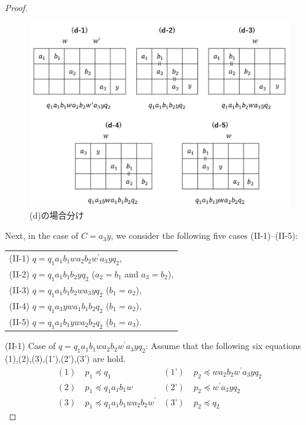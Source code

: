 \begin{proof}
\begin{figure}
  \centering
  \includegraphics[width=\linewidth]{figs/Cases-d.png}
  \vspace{-1cm}
  \caption{(d)の場合分け}
  \label{d組み合わせ}
\end{figure}
    
Next, in the case of $C=a_{3}y$, we consider the following five cases (II-1)--(II-5):

\begin{tabular}{l}
(II-1) $q=q_{1}a_{1}b_{1}wa_{2}b_{2}w^{\prime}a_{3}yq_{2}$,\\
(II-2) $q=q_{1}a_{1}b_{1}b_{2}yq_{2}$ ($a_{2}=b_{1}$ and $a_{3}=b_{2}$),\\
(II-3) $q=q_{1}a_{1}b_{1}b_{2}wa_{3}yq_{2}$ ($b_{1}=a_{2}$),\\
(II-4) $q=q_{1}a_{3}ywa_{1}b_{1}b_{2}q_{2}$ ($b_{1}=a_{2}$),\\
(II-5) $q=q_{1}a_{1}b_{1}ywa_{2}b_{2}q_{2}$ ($b_{1}=a_{3}$).
\end{tabular}

\noindent
(II-1) Case of $q=q_{1}a_{1}b_{1}wa_{2}b_{2}w^{\prime}a_{3}yq_{2}$:
Assume that the following six equations (1),(2),(3),(1'),(2'),(3') are hold.
\begin{align*}
(1)~& p_{1} \preceq q_{1} & (\text{1'})~& p_{2} \preceq wa_{2}b_{2}w^{\prime}a_{3}yq_{2} \\
(2)~& p_{1} \preceq q_{1}a_{1}b_{1}w & (\text{2'})~& p_{2} \preceq w^{\prime}a_{3}yq_{2} \\
(3)~& p_{1} \preceq q_{1}a_{1}b_{1}wa_{2}b_{2}w^{\prime} & (\text{3'})~& p_{2} \preceq q_{2}
\end{align*}


\end{proof}
